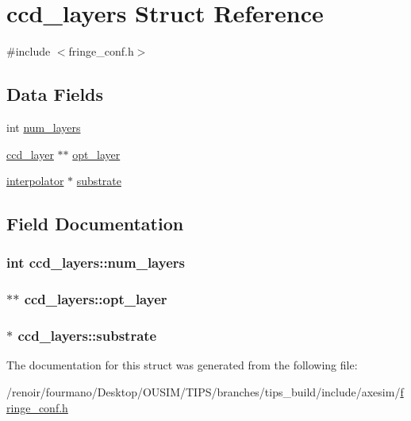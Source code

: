 \hypertarget{structccd__layers}{
\section{ccd\_\-layers Struct Reference}
\label{structccd__layers}
}


{\ttfamily \#include $<$fringe\_\-conf.h$>$}\subsection*{Data Fields}
\begin{DoxyCompactItemize}
\item 
int \hyperlink{structccd__layers_a228a06a9acfab17cbdec81a21e82a58a}{num\_\-layers}
\item 
\hyperlink{structccd__layer}{ccd\_\-layer} $\ast$$\ast$ \hyperlink{structccd__layers_ae9861ce32cfcdbdec138e90f66f8ce9f}{opt\_\-layer}
\item 
\hyperlink{structinterpolator}{interpolator} $\ast$ \hyperlink{structccd__layers_ab144a515d289cf051cabcecc9adf8343}{substrate}
\end{DoxyCompactItemize}


\subsection{Field Documentation}
\hypertarget{structccd__layers_a228a06a9acfab17cbdec81a21e82a58a}{
\subsubsection[{num\_\-layers}]{\setlength{\rightskip}{0pt plus 5cm}int {\bf ccd\_\-layers::num\_\-layers}}}
\label{structccd__layers_a228a06a9acfab17cbdec81a21e82a58a}
\hypertarget{structccd__layers_ae9861ce32cfcdbdec138e90f66f8ce9f}{
\subsubsection[{opt\_\-layer}]{$\ast$$\ast$ {\bf ccd\_\-layers::opt\_\-layer}}}
\label{structccd__layers_ae9861ce32cfcdbdec138e90f66f8ce9f}
\hypertarget{structccd__layers_ab144a515d289cf051cabcecc9adf8343}{
\subsubsection[{substrate}]{$\ast$ {\bf ccd\_\-layers::substrate}}}
\label{structccd__layers_ab144a515d289cf051cabcecc9adf8343}


The documentation for this struct was generated from the following file:\begin{DoxyCompactItemize}
\item 
/renoir/fourmano/Desktop/OUSIM/TIPS/branches/tips\_\-build/include/axesim/\hyperlink{fringe__conf_8h}{fringe\_\-conf.h}\end{DoxyCompactItemize}
